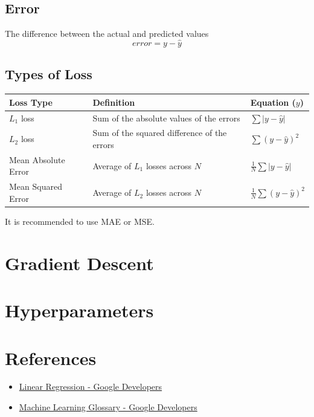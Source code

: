 \documentclass[a4paper,12pt]{article}
\begin{document}
\subsection*{Error}
The difference between the actual and predicted values
\begin{equation}
error = y - \hat{y}
\end{equation}

\subsection*{Types of Loss}
\begin{center}
\begin{tabularx}{\textwidth}{@{}lXl@{}}
\toprule
Loss Type & Definition & Equation ($y$) \\ 
\midrule
$L_1$ loss & Sum of the absolute values of the errors & $\sum |y - \hat{y}|$ \\
$L_2$ loss & Sum of the squared difference of the errors & $\sum (y - \hat{y})^2$ \\
Mean Absolute Error & Average of $L_1$ losses across $N$ & $ \frac{1}{N} \sum |y - \hat{y}|$ \\
Mean Squared Error & Average of $L_2$ losses across $N$ & $ \frac{1}{N} \sum (y - \hat{y})^2$ \\
\bottomrule
\end{tabularx}
\end{center}

\noindent It is recommended to use MAE or MSE.


\section*{Gradient Descent}

\section*{Hyperparameters}


\section*{References}
\begin{itemize}
    \item \href{https://developers.google.com/machine-learning/crash-course/linear-regression}{Linear Regression - Google Developers}
    \item \href{https://developers.google.com/machine-learning/glossary}{Machine Learning Glossary - Google Developers}
\end{itemize}
\end{document}

